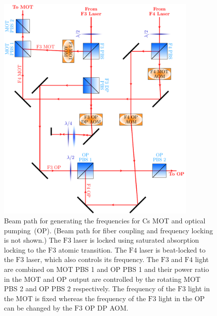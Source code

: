 \begin{figure}
  \centering
  \includegraphics[width=0.866\textwidth]{figures/loading_cs_res_beampath.pdf}
  \caption[Beam path for Cs $\mathrm{D2}$ light.]{
    Beam path for generating the frequencies for Cs MOT and optical pumping~(OP).
    (Beam path for fiber coupling and frequency locking is not shown.)
    The $\mathrm{F3}$ laser is locked using saturated absorption locking
    to the $\mathrm{F3}$ atomic transition.
    The $\mathrm{F4}$ laser is beat-locked to the $\mathrm{F3}$ laser,
    which also controls its frequency.
    The $\mathrm{F3}$ and $\mathrm{F4}$ light are combined on MOT PBS 1 and OP PBS 1
    and their power ratio in the MOT and OP output are controlled by the
    rotating MOT PBS 2 and OP PBS 2 respectively.
    The frequency of the $\mathrm{F3}$ light in the MOT is fixed whereas
    the frequency of the $\mathrm{F3}$ light in the OP
    can be changed by the $\mathrm{F3}$ OP DP AOM.
    \label{fig:loading:free-space:cs-res-beampath}}
\end{figure}


